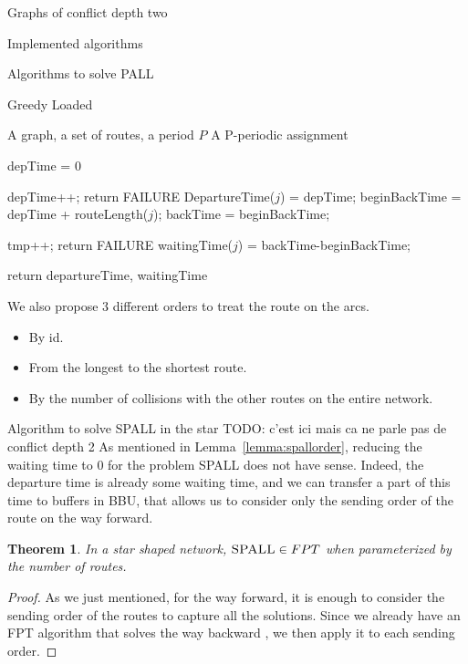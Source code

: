 \documentclass[10pt]{article}
\newtheorem{theorem}{Theorem}
\newcommand{\todo}[1]{{\color{red} TODO: {#1}}}
\newcommand\spall{\textsc{SPALL}\xspace}
\begin{document}
\begin{section}{Graphs of conflict depth two}
\begin{subsection}{Implemented algorithms}
\begin{subsubsection}{Algorithms to solve PALL}
\begin{paragraph}{Greedy Loaded}
   	\begin{algorithm}[H]
 	\caption{Greedy Loaded}
 	\begin{algorithmic}
 	\REQUIRE A graph, a set of routes, a period $P$
	\ENSURE A P-periodic assignment

	
	\STATE depTime = $0$
	
 	
 	\STATE depTime++;
	\STATE return FAILURE
	\ENDIF
 	\ENDWHILE
	\STATE DepartureTime($j$) = depTime;
	\STATE beginBackTime = depTime + routeLength($j$);
	\STATE backTime = beginBackTime;
	
 	
 	\STATE tmp++;
	\STATE return FAILURE
	\ENDIF
 	\ENDWHILE
	\STATE waitingTime($j$) = backTime-beginBackTime;
	\ENDIF
 	\ENDFOR

 	\ENDFOR
	\STATE return departureTime, waitingTime

 	\end{algorithmic}
 	\end{algorithm}
We also propose $3$ different orders to treat the route on the arcs. 
\begin{itemize}
\item By id.
\item From the longest to the shortest route.
\item By the number of collisions with the other routes on the entire network.
\end{itemize}
    \end{paragraph}
     	  \end{subsubsection}
  \begin{subsubsection}{Algorithm to solve \spall in the star}
  \todo{c'est ici mais ca ne parle pas de conflict depth 2}
  As mentioned in Lemma~\ref{lemma:spallorder}, reducing the waiting time to $0$ for the problem \spall does not have sense. Indeed, the departure time is already some waiting time, and we can transfer a part of this time to buffers in BBU, that allows us to consider only the sending order of the route on the way forward.
  \begin{theorem} In a star shaped network, $\spall  \in FPT$ when parameterized by the number of routes.
  \end{theorem}
\begin{proof}
As we just mentioned, for the way forward, it is enough to consider the sending order of the routes to capture all the solutions.
Since we already have an FPT algorithm that solves the way backward \cite{Guir1806:Deterministic}, we then apply it to each sending order.
\end{proof}


\end{subsubsection}
\end{subsection}
\end{section}
\end{document}
